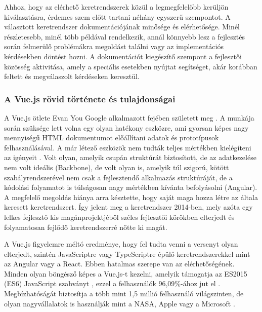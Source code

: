 \documentclass[12pt]{article}
\begin{document}
Ahhoz, hogy az elérhető keretrendszerek közül a legmegfelelőbb kerüljön kiválasztásra, érdemes szem előtt tartani néhány egyszerű szempontot. A választott keretrendszer dokumentációjának minősége és elérhetősége. Minél részletesebb, minél több példával rendelkezik, annál könnyebb lesz a fejlesztés során felmerülő problémákra megoldást találni vagy az implementációs kérdésekben döntést hozni. A dokumentációt kiegészítő szempont a fejlesztői közösség aktivitása, amely a speciális esetekben nyújtat segítséget, akár korábban feltett és megválaszolt kérdéseken keresztül.

\subsubsection{A Vue.js rövid története és tulajdonságai}

A Vue.js ötlete Evan You Google alkalmazott fejében született meg \cite{VUE_BOOK}. A munkája során szüksége lett volna egy olyan hatékony eszközre, ami gyorsan képes nagy mennyiségű HTML dokumentumot előállítani adatok és prototípusok felhasználásával. A már létező eszközök nem tudták teljes mértékben kielégíteni az igényeit \cite{VUE_BOOK}. Volt olyan, amelyik csupán struktúrát biztosított, de az adatkezelése nem volt ideális (Backbone), de volt olyan is, amelyik túl szigorú, kötött szabályrendszerével nem csak a fejlesztendő alkalmazás struktúráját, de a kódolási folyamatot is túlságosan nagy mértékben kívánta befolyásolni (Angular). A megfelelő megoldás hiánya arra késztette, hogy saját maga hozza létre az általa keresett keretrendszert. Így jelent meg a keretrendszer 2014-ben, mely azóta egy lelkes fejlesztő kis magánprojektjéből széles fejlesztői körökben elterjedt és folyamatosan fejlődő keretrendszerré nőtte ki magát.

A Vue.js figyelemre méltó eredménye, hogy fel tudta venni a versenyt olyan elterjedt, szintén JavaScriptre vagy TypeScriptre épülő keretrendszerekkel mint az Angular vagy a React. Ebben hatalmas szerepe van az elérhetőségének. Minden olyan böngésző képes a Vue.js-t kezelni, amelyik támogatja az ES2015 (ES6) JavaScript szabványt \cite{VUE_SUPP}, ezzel a felhasználók 96,09\%-ához jut el \cite{ES2015_USAGE}. Megbízhatóságát biztosítja a több mint 1,5 millió felhasználó világszinten, de olyan nagyvállalatok is használják mint a NASA, Apple vagy a Microsoft \cite{VUE_COMPANIES}.
\end{document}
